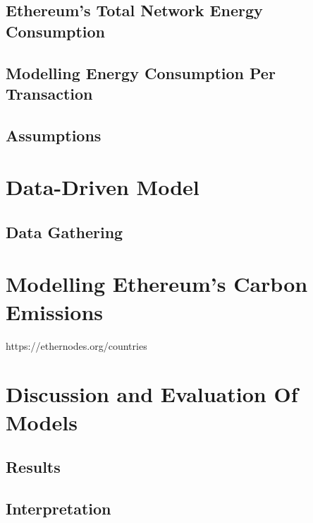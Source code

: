 \subsection{Ethereum's Total Network Energy Consumption}

\subsection {Modelling Energy Consumption Per Transaction}

\subsection{Assumptions}

\section{ Data-Driven Model}
\subsection{Data Gathering}






\section {Modelling Ethereum's Carbon Emissions}
https://ethernodes.org/countries

\section{Discussion and Evaluation Of Models}
\subsection{Results}
\subsection{Interpretation}



